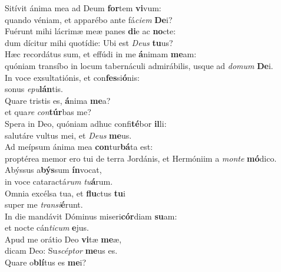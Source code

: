\evenverse Sitívit ánima mea ad Deum \textbf{for}tem \textbf{vi}vum:~\*\\
\evenverse quando véniam, et apparébo ante fá\textit{ci}\textit{em} \textbf{De}i?\\
\oddverse Fuérunt mihi lácrimæ meæ panes \textbf{di}e ac \textbf{no}cte:~\*\\
\oddverse dum dícitur mihi quotídie: Ubi est \textit{De}\textit{us} \textbf{tu}us?\\
\evenverse Hæc recordátus sum, et effúdi in me \textbf{á}nimam \textbf{me}am:~\*\\
\evenverse quóniam transíbo in locum tabernáculi admirábilis, usque ad \textit{do}\textit{mum} \textbf{De}i.\\
\oddverse In voce exsultatiónis, et con\textbf{fes}si\textbf{ó}nis:~\*\\
\oddverse sonus \textit{e}\textit{pu}\textbf{lán}tis.\\
\evenverse Quare tristis es, \textbf{á}nima \textbf{me}a?~\*\\
\evenverse et qua\textit{re} \textit{con}\textbf{túr}bas me?\\
\oddverse Spera in Deo, quóniam adhuc confi\textbf{té}bor \textbf{il}li:~\*\\
\oddverse salutáre vultus mei, et \textit{De}\textit{us} \textbf{me}us.\\
\evenverse Ad meípsum ánima mea \textbf{con}tur\textbf{bá}ta est:~\*\\
\evenverse proptérea memor ero tui de terra Jordánis, et Hermóniim a \textit{mon}\textit{te} \textbf{mó}dico.\\
\oddverse Abýssus a\textbf{býs}sum \textbf{ín}vocat,~\*\\
\oddverse in voce cataractá\textit{rum} \textit{tu}\textbf{á}rum.\\
\evenverse Omnia excélsa tua, et \textbf{flu}ctus \textbf{tu}i~\*\\
\evenverse super me \textit{tran}\textit{si}\textbf{é}runt.\\
\oddverse In die mandávit Dóminus miseri\textbf{cór}diam \textbf{su}am:~\*\\
\oddverse et nocte cán\textit{ti}\textit{cum} \textbf{e}jus.\\
\evenverse Apud me orátio Deo \textbf{vi}tæ \textbf{me}æ,~\*\\
\evenverse dicam Deo: Su\textit{scép}\textit{tor} \textbf{me}us es.\\
\oddverse Quare o\textbf{blí}tus es \textbf{me}i?~\*\\
